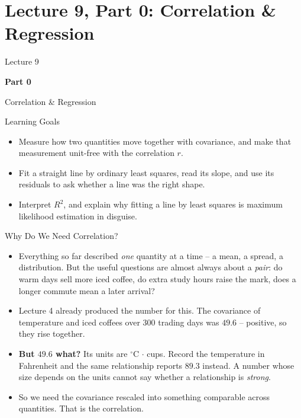 \section{Lecture 9, Part 0: Correlation \& Regression}

\begin{frame}
\vfill
\centering
{\color{RLBlue}\large Lecture 9}

\vspace{0.3em}
{\color{RLBlue}\Large\bfseries Part 0}

\vspace{0.6em}
{\Large Correlation \& Regression}
\vfill
\end{frame}

\begin{frame}{Learning Goals}
\begin{itemize}
  \item Measure how two quantities move together with covariance, and make that measurement unit-free with the correlation $r$.
  \pause
  \item Fit a straight line by ordinary least squares, read its slope, and use its residuals to ask whether a line was the right shape.
  \pause
  \item Interpret $R^2$, and explain why fitting a line by least squares is maximum likelihood estimation in disguise.
\end{itemize}
\end{frame}

\begin{frame}{Why Do We Need Correlation?}
\begin{itemize}
  \item Everything so far described \emph{one} quantity at a time -- a mean, a spread, a distribution. But the useful questions are almost always about a \emph{pair}: do warm days sell more iced coffee, do extra study hours raise the mark, does a longer commute mean a later arrival?
  \pause
  \item Lecture 4 already produced the number for this. The covariance of temperature and iced coffees over $300$ trading days was $49.6$ -- positive, so they rise together.
  \pause
  \item \textbf{But $49.6$ what?} Its units are $^\circ$C$\,\cdot\,$cups. Record the temperature in Fahrenheit and the same relationship reports $89.3$ instead. A number whose size depends on the units cannot say whether a relationship is \emph{strong}.
  \pause
  \item So we need the covariance rescaled into something comparable across quantities. That is the correlation.
\end{itemize}
\end{frame}

